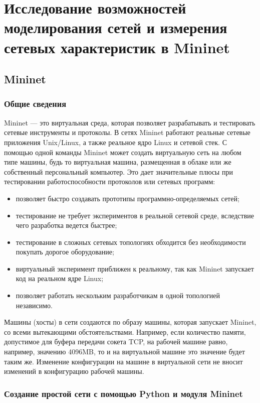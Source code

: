 \chapter{Исследование возможностей моделирования сетей и измерения
  сетевых характеристик в Mininet}

\section{Mininet}

\subsection{Общие сведения}

Mininet \cite{mininet} --- это виртуальная среда, которая
позволяет разрабатывать и тестировать сетевые инструменты и
протоколы. В сетях Mininet работают реальные сетевые приложения
Unix/Linux, а также реальное ядро Linux и сетевой стек. С помощью
одной команды Mininet может создать виртуальную сеть на любом типе
машины, будь то виртуальная машина, размещенная в облаке или же
собственный персональный компьютер.  Это дает значительные плюсы при
тестировании работоспособности протоколов или сетевых программ:
\begin{itemize}
\item позволяет быстро создавать прототипы программно-определяемых
  сетей;
\item тестирование не требует экспериментов в реальной сетевой среде,
  вследствие чего разработка ведется быстрее;
\item тестирование в сложных сетевых топологиях обходится без
  необходимости покупать дорогое оборудование;
\item виртуальный эксперимент приближен к реальному, так как Mininet
  запускает код на реальном ядре Linux;
\item позволяет работать нескольким разработчикам в одной топологией
  независимо.
\end{itemize}

Машины (хосты) в сети создаются по образу машины, которая запускает
Mininet, со всеми вытекающими обстоятельствами. Например, если
количество памяти, допустимое для буфера передачи сокета TCP, на
рабочей машине равно, например, значению 4096MB, то и на виртуальной
машине это значение будет таким же. Изменение конфигурации на машине в
виртуальной сети не вносит изменений в конфигурацию рабочей машины.

\subsection{Создание простой сети с помощью Python и модуля
  Mininet}

